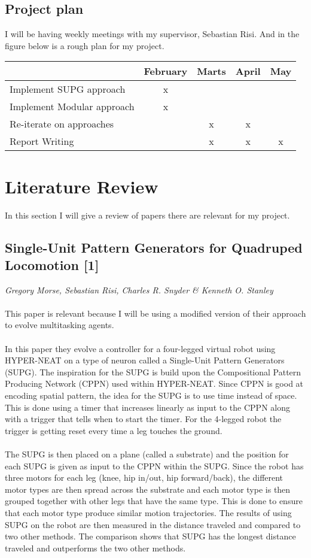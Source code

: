 \documentclass[11pt, a4paper]{article}
\begin{document}
\subsection{Project plan}
I will be having weekly meetings with my supervisor, Sebastian Risi. And in the figure below is a rough plan for my project.
\\
\begin{tabular}{ l | c  c c c }
  \hline			
   & February & Marts & April & May \\
  \hline
  Implement SUPG approach 	 & x &   &   &	 \\
  Implement Modular approach & x &   &   &	 \\ 
  Re-iterate on approaches 	 &   & x & x &	 \\
  Report Writing 			 &   & x & x & x \\
  \hline  
\end{tabular}
\section{Literature Review}
In this section I will give a review of papers there are relevant for my project.
\subsection{Single-Unit Pattern Generators for Quadruped Locomotion [1]}
\textit{Gregory Morse, Sebastian Risi, Charles R. Snyder \& Kenneth O. Stanley}
\\ \\
This paper is relevant because I will be using a modified version of their approach to evolve multitasking agents.
\\ \\
In this paper they evolve a controller for a four-legged virtual robot using HYPER-NEAT on a type of neuron called a Single-Unit Pattern Generators (SUPG). The inspiration for the SUPG is build upon the Compositional Pattern Producing Network (CPPN) used within HYPER-NEAT. Since CPPN is good at encoding spatial pattern, the idea for the SUPG is to use time instead of space. This is done using a timer that increases linearly as input to the CPPN along with a trigger that tells when to start the timer. For the 4-legged robot the trigger is getting reset every time a leg touches the ground.
\\ \\
The SUPG is then placed on a plane (called a substrate) and the position for each SUPG is given as input to the CPPN within the SUPG. Since the robot has three motors for each leg (knee, hip in/out, hip forward/back), the different motor types are then spread across the substrate and each motor type is then grouped together with other legs that have the same type. This is done to ensure that each motor type produce similar motion trajectories. The results of using SUPG on the robot are then measured in the distance traveled and compared to two other methods. The comparison shows that SUPG has the longest distance traveled and outperforms the two other methods.
\\ \\
\end{document}

